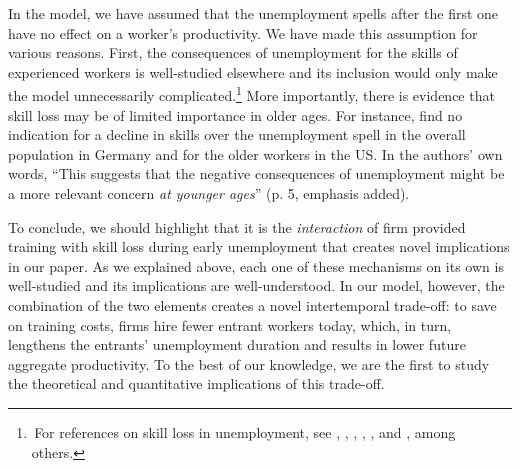 \documentclass[12pt]{article} %
\theoremstyle{definition}
\begin{document}
In the model, we have assumed that the unemployment spells after the first one have no effect on a worker's productivity.
We have made this assumption for various reasons. 
First, the consequences of unemployment for the skills of experienced workers is well-studied elsewhere and its inclusion would only make the model unnecessarily complicated.\footnote{\,For references on skill loss in unemployment, see \cite{pissarides1992loss}, \cite{ljungqvist1998european}, \cite{coles2000retraining}, \cite{ortego2016unemployment}, \cite{flemming2020skill}, and \cite{kospentaris2021unobserved}, among others.}
More importantly, there is evidence that skill loss may be of limited importance in older ages.
For instance, \cite{cohen2023skill} find no indication for a decline in skills over the unemployment spell in the overall population in Germany and for the older workers in the US. In the authors' own words, ``This suggests that the negative consequences of unemployment might be a more relevant concern \textit{at younger ages}'' (p. 5, emphasis added).

To conclude, we should highlight that it is the \textit{interaction} of firm provided training with skill loss during early unemployment that creates novel implications in our paper.
As we explained above, each one of these mechanisms on its own is well-studied and its implications are well-understood.
In our model, however, the combination of the two elements creates a novel intertemporal trade-off: to save on training costs, firms hire fewer entrant workers today, which, in turn, lengthens the entrants' unemployment duration and results in lower future aggregate productivity.
To the best of our knowledge, we are the first to study the theoretical and quantitative implications of this trade-off.

\end{document}
